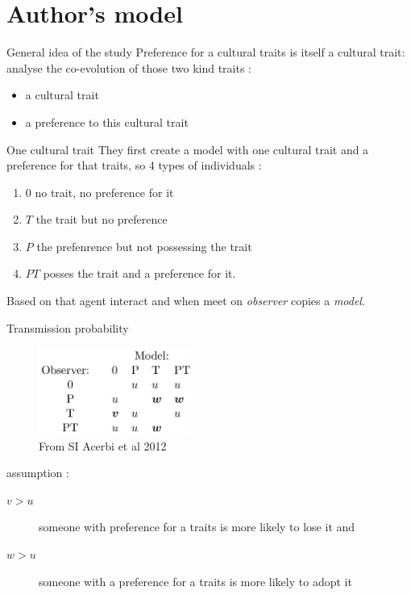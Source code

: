 \documentclass{beamer}
\begin{document}
\section{Author's model}
\begin{frame}
    \begin{block}{General idea of the study}
	Preference for a cultural traits is itself a cultural trait: analyse the co-evolution of those two kind traits :
	\begin{itemize}
	    \item a cultural trait
	    \item a preference to this cultural trait
	\end{itemize}
    \end{block}
\end{frame}
\begin{frame}{One cultural trait}
    They first create a model with one cultural trait and a preference for that traits, so 4 types of individuals :
    \begin{enumerate}
	\item $0$ no trait, no preference for it
	\item $T$ the trait but no preference
	\item $P$ the prefenrence but not possessing the trait
	\item $PT$ posses the trait and a preference for it.
    \end{enumerate}
    Based on that agent interact and when meet on \emph{observer} copies a \emph{model}.
\end{frame}
\begin{frame}{Transmission probability}
    \begin{figure}
	\center
	\includegraphics[width=5cm]{table_s1.png}
	\caption{From SI Acerbi et al 2012}
    \end{figure}

    assumption :
    \begin{description}
	\item[$v>u$]someone with preference for a traits is more likely to lose it and 
	\item[$w>u$]someone with a preference for a traits is more likely to adopt it
    \end{description}
    
\end{frame}
\end{document}
